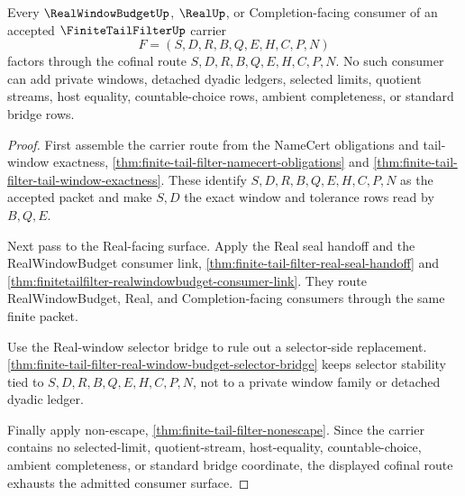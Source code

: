 \begin{theorem}
\label{thm:finite-tail-filter-cofinal-route-exhaustion}
Every $\RealWindowBudgetUp$, $\RealUp$, or Completion-facing consumer of an
accepted $\FiniteTailFilterUp$ carrier
$$
F=(S,D,R,B,Q,E,H,C,P,N)
$$
factors through the cofinal route $S,D,R,B,Q,E,H,C,P,N$. No such consumer can
add private windows, detached dyadic ledgers, selected limits, quotient streams,
host equality, countable-choice rows, ambient completeness, or standard bridge
rows.
\end{theorem}
\begin{proof}
First assemble the carrier route from the NameCert obligations and tail-window
exactness, \autoref{thm:finite-tail-filter-namecert-obligations} and
\autoref{thm:finite-tail-filter-tail-window-exactness}. These identify
$S,D,R,B,Q,E,H,C,P,N$ as the accepted packet and make $S,D$ the exact window and
tolerance rows read by $B,Q,E$.

Next pass to the Real-facing surface. Apply the Real seal handoff and the
RealWindowBudget consumer link,
\autoref{thm:finite-tail-filter-real-seal-handoff} and
\autoref{thm:finitetailfilter-realwindowbudget-consumer-link}. They route
RealWindowBudget, Real, and Completion-facing consumers through the same finite
packet.

Use the Real-window selector bridge to rule out a selector-side replacement.
\autoref{thm:finite-tail-filter-real-window-budget-selector-bridge} keeps
selector stability tied to $S,D,R,B,Q,E,H,C,P,N$, not to a private window family
or detached dyadic ledger.

Finally apply non-escape,
\autoref{thm:finite-tail-filter-nonescape}. Since the carrier contains no
selected-limit, quotient-stream, host-equality, countable-choice, ambient
completeness, or standard bridge coordinate, the displayed cofinal route
exhausts the admitted consumer surface.
\end{proof}

